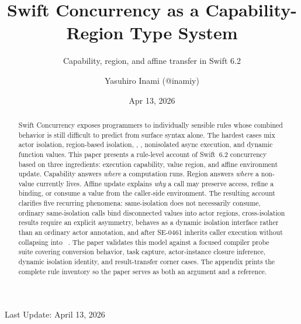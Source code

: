 \documentclass[acmsmall,nonacm,screen,10pt]{acmart}
\title{Swift Concurrency as a Capability-Region Type System}
\subtitle{Capability, region, and affine transfer in Swift 6.2}
\author{Yasuhiro Inami (@inamiy)}
\affiliation{%
  \institution{try! Swift Tokyo 2026}
  \country{Japan}
}
\date{Apr 13, 2026}
\begin{document}
\begin{abstract}
Swift Concurrency exposes programmers to individually sensible rules whose combined behavior is still difficult to predict from surface syntax alone. The hardest cases mix actor isolation, region-based isolation, , , nonisolated async execution, and dynamic  function values. This paper presents a rule-level account of Swift~6.2 concurrency based on three ingredients: execution capability, value region, and affine environment update. Capability answers \emph{where} a computation runs. Region answers \emph{where} a non- value currently lives. Affine update explains \emph{why} a call may preserve access, refine a binding, or consume a value from the caller-side environment. The resulting account clarifies five recurring phenomena: same-isolation  does not necessarily consume, ordinary same-isolation calls bind disconnected values into actor regions, cross-isolation results require an explicit  asymmetry,  behaves as a dynamic isolation interface rather than an ordinary actor annotation, and  after SE-0461 inherits caller execution without collapsing into ~\cite{se0461}. The paper validates this model against a focused compiler probe suite covering conversion behavior, task capture, actor-instance closure inference, dynamic isolation identity, and result-transfer corner cases. The appendix prints the complete rule inventory so the paper serves as both an argument and a reference.
\end{abstract}


\maketitle
{\small Last Update: April 13, 2026}
\bigskip











\appendix
\clearpage

\clearpage

\clearpage

\clearpage


\clearpage


\end{document}
